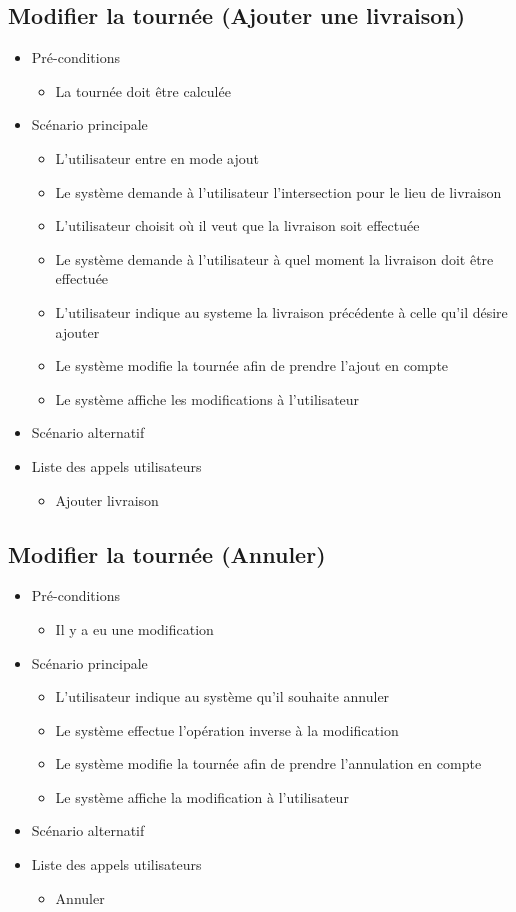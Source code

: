 \documentclass[10pt,a4paper]{book}
\begin{document}
\subsection{Modifier la tournée (Ajouter une livraison)}
\begin{itemize}
	\item{Pré-conditions}
		\begin{itemize}
		\item{La tournée doit être calculée}
	\end{itemize}
	\item{Scénario principale}
	\begin{itemize}
		\item{L’utilisateur entre en mode ajout}
		\item{Le système demande à l’utilisateur l’intersection pour le lieu de livraison}
		\item{L’utilisateur choisit  où il veut que la livraison soit effectuée}
		\item{Le système demande à l’utilisateur à quel moment la livraison doit être effectuée}
		\item{L’utilisateur indique au systeme la livraison précédente à celle qu’il désire ajouter}
		\item{Le système modifie la tournée afin de prendre l’ajout en compte}
		\item{Le système affiche les modifications à l’utilisateur}
	\end{itemize}
	\item{Scénario alternatif}
	\item{Liste des appels utilisateurs}
	\begin{itemize}
		\item{Ajouter livraison}
	\end{itemize}
\end{itemize}
\subsection{Modifier la tournée (Annuler)}
\begin{itemize}
	\item{Pré-conditions}
		\begin{itemize}
		\item{Il y a eu une modification}
	\end{itemize}
	\item{Scénario principale}
	\begin{itemize}
		\item{L’utilisateur indique au système qu’il souhaite annuler}
		\item{Le système effectue l’opération inverse à la modification}
		\item{Le système modifie la tournée afin de prendre l’annulation en compte}
		\item{Le système affiche la modification à l’utilisateur}
	\end{itemize}
	\item{Scénario alternatif}
	\item{Liste des appels utilisateurs}
	\begin{itemize}
		\item{Annuler}
	\end{itemize}
\end{itemize}
\end{document}
